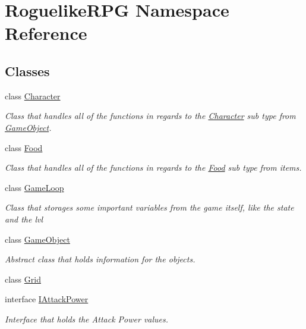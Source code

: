 \hypertarget{namespace_roguelike_r_p_g}{}\section{Roguelike\+R\+PG Namespace Reference}
\label{namespace_roguelike_r_p_g}
\subsection*{Classes}
\begin{DoxyCompactItemize}
\item 
class \mbox{\hyperlink{class_roguelike_r_p_g_1_1_character}{Character}}
\begin{DoxyCompactList}\small\item\em Class that handles all of the functions in regards to the \mbox{\hyperlink{class_roguelike_r_p_g_1_1_character}{Character}} sub type from \mbox{\hyperlink{class_roguelike_r_p_g_1_1_game_object}{Game\+Object}}. \end{DoxyCompactList}\item 
class \mbox{\hyperlink{class_roguelike_r_p_g_1_1_food}{Food}}
\begin{DoxyCompactList}\small\item\em Class that handles all of the functions in regards to the \mbox{\hyperlink{class_roguelike_r_p_g_1_1_food}{Food}} sub type from items. \end{DoxyCompactList}\item 
class \mbox{\hyperlink{class_roguelike_r_p_g_1_1_game_loop}{Game\+Loop}}
\begin{DoxyCompactList}\small\item\em Class that storages some important variables from the game itself, like the state and the lvl \end{DoxyCompactList}\item 
class \mbox{\hyperlink{class_roguelike_r_p_g_1_1_game_object}{Game\+Object}}
\begin{DoxyCompactList}\small\item\em Abstract class that holds information for the objects. \end{DoxyCompactList}\item 
class \mbox{\hyperlink{class_roguelike_r_p_g_1_1_grid}{Grid}}
\item 
interface \mbox{\hyperlink{interface_roguelike_r_p_g_1_1_i_attack_power}{I\+Attack\+Power}}
\begin{DoxyCompactList}\small\item\em Interface that holds the Attack Power values. \end{DoxyCompactList}\item 

\end{DoxyCompactItemize}
